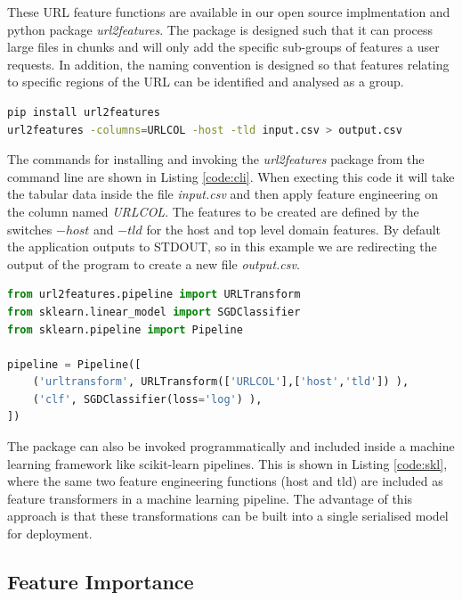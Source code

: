 \documentclass{aircc}
\begin{document}
These URL feature functions are available in our open source implmentation and python package \emph{url2features}. 
The package is designed such that it can process large files in chunks and will only add the specific sub-groups of
features a user requests. In addition, the naming convention is designed so that features relating to specific
regions of the URL can be identified and analysed as a group.

\begin{lstlisting}[language=Bash,label={code:cli}, caption=Install and invoke the url2features package from CLI]
pip install url2features
url2features -columns=URLCOL -host -tld input.csv > output.csv
\end{lstlisting}

The commands for installing and invoking the \emph{url2features} package from the command line are shown
in Listing \ref{code:cli}. 
When execting this code it will take the tabular data inside the file \emph{input.csv} and then apply feature 
engineering on the column named \emph{URLCOL}. The features to be created are defined by the switches 
$-host$ and $-tld$ for the host and top level domain features. By default the application outputs to
STDOUT, so in this example we are redirecting the output of the program to create a new file \emph{output.csv}. 

\begin{lstlisting}[language=Python,label={code:skl}, caption=Usage of url2features with scikit-learn pipelines ]
from url2features.pipeline import URLTransform
from sklearn.linear_model import SGDClassifier
from sklearn.pipeline import Pipeline

pipeline = Pipeline([
    ('urltransform', URLTransform(['URLCOL'],['host','tld']) ),
    ('clf', SGDClassifier(loss='log') ),
])
\end{lstlisting}

The package can also be invoked programmatically and included inside a machine learning framework like 
scikit-learn pipelines\cite{pedregosa2011scikit}. This is shown in Listing \ref{code:skl}, where the
same two feature engineering functions (host and tld) are included as feature transformers in a machine 
learning pipeline. The advantage of this approach is that these transformations can be built into a single
serialised model for deployment.

\subsection{Feature Importance}
\end{document}
